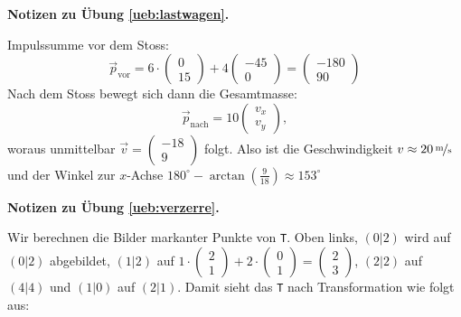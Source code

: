 \documentclass[%
11pt,%
twoside,%
titlepage,%
german,%
headsepline%
]{scrartcl}
\theoremstyle{definition}
\theoremstyle{plain}
\newcommand{\concatueb}[1]{ueb:#1}%
\newcommand{\concatlsg}[1]{lsg:#1}%
\newenvironment{lsg}[1]{%
    \par\noindent\textbf{Notizen zu Übung \ref{\concatueb{#1}}.}%
    \label{\concatlsg{#1}}
}{%
    \par%
}
\begin{document}
\begin{lsg}{lastwagen}
    Impulssumme vor dem Stoss:
    $$\vec{p}_{\text{vor}}=6\cdot\begin{pmatrix}
        0\\15
    \end{pmatrix}+4\begin{pmatrix}
        -45\\0
    \end{pmatrix}=\begin{pmatrix}
        -180\\90
    \end{pmatrix}$$
    Nach dem Stoss bewegt sich dann die Gesamtmasse:
    $$\vec{p}_{\text{nach}}=10\begin{pmatrix}
        v_x\\ v_y
    \end{pmatrix},$$
    woraus unmittelbar $\vec{v}=\begin{pmatrix}
        -18\\9
    \end{pmatrix}$ folgt. Also ist die Geschwindigkeit $v\approx\unitfrac[20]{m}{s}$ und der Winkel zur $x$-Achse $180^\circ-\arctan(\frac{9}{18})\approx153^\circ$
\end{lsg}
\begin{lsg}{verzerre}
    Wir berechnen die Bilder markanter Punkte von \texttt{T}. Oben links, $(0|2)$ wird auf $(0|2)$ abgebildet, $(1|2)$ auf $1\cdot\begin{pmatrix}
        2\\1
    \end{pmatrix}+2\cdot\begin{pmatrix}
        0\\1
    \end{pmatrix}=\begin{pmatrix}
        2\\3
    \end{pmatrix}$, $(2|2)$ auf $(4|4)$ und $(1|0)$ auf $(2|1)$. Damit sieht das \texttt{T} nach Transformation wie folgt aus:

    \begin{center}
\end{center}
\end{lsg}
\end{document}
